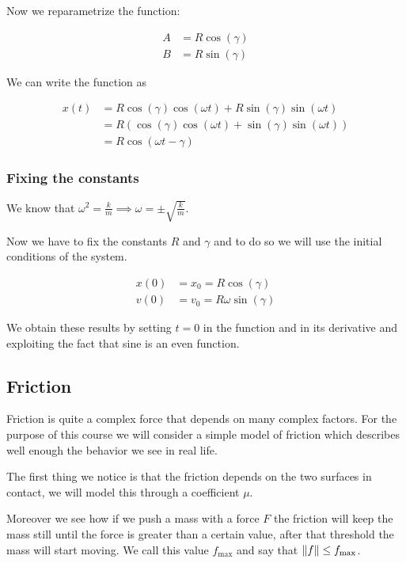 \documentclass[10pt]{extarticle}
\begin{document}
Now we reparametrize the function:

\begin{align*}
    A & = R \cos(\gamma) \\
    B & = R \sin(\gamma)
\end{align*}

We can write the function as

\begin{align*}
    x(t) & = R \cos(\gamma) \cos(\omega t) + R \sin(\gamma) \sin(\omega t)              \\
         & = R \left( \cos(\gamma) \cos(\omega t) + \sin(\gamma) \sin(\omega t) \right) \\
         & = R \cos(\omega t - \gamma)
\end{align*}

\subsubsection{Fixing the constants}

We know that $\omega^2 = \frac{k}{m} \implies \omega = \pm \sqrt{\frac{k}{m}}$.

Now we have to fix the constants $R$ and $\gamma$ and to do so we will use the initial conditions of the system.

\begin{align*}
    x(0) & = x_0 = R \cos(\gamma)        \\
    v(0) & = v_0 = R \omega \sin(\gamma)
\end{align*}

We obtain these results by setting $t = 0$ in the function and in its derivative and exploiting the fact that sine is an even function.

\subsection{Friction}

Friction is quite a complex force that depends on many complex factors. For the purpose of this course we will consider a simple model of friction which describes well enough the behavior we see in real life.

The first thing we notice is that the friction depends on the two surfaces in contact, we will model this through a coefficient $\mu$.

Moreover we see how if we push a mass with a force $F$ the friction will keep the mass still until the force is greater than a certain value, after that threshold the mass will start moving.
We call this value $f_{\text{max}}$ and say that $\norm{f} \leq f_{\text{max}}$.
\end{document}
